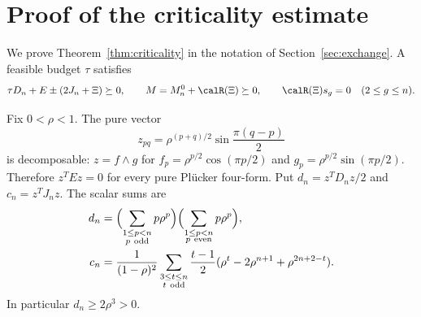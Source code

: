 \section{Proof of the criticality estimate}\label{app:criticality}
We prove Theorem~\ref{thm:criticality} in the notation of
Section~\ref{sec:exchange}. A feasible
budget $\tau$ satisfies
\begin{equation}\label{eq:critical-feasible}
 \tau D_n+E\pm(2J_n+\Xi)\succeq0,\qquad
 M=M_n^0+\calR(\Xi)\succeq0,
 \qquad \calR(\Xi)s_g=0\quad(2\le g\le n).
\end{equation}

Fix $0<\rho<1$. The pure vector
\[
 z_{pq}=\rho^{(p+q)/2}\sin\frac{\pi(q-p)}2
\]
is decomposable: $z=f\wedge g$ for
$f_p=\rho^{p/2}\cos(\pi p/2)$ and $g_p=\rho^{p/2}\sin(\pi p/2)$.
Therefore $z^TEz=0$ for every pure Pl\"ucker four-form.
Put $d_n=z^TD_nz/2$ and $c_n=z^TJ_n z$. The scalar sums are
\begin{equation}\label{eq:critical-scalars}
\begin{split}
 d_n&=\Bigl(\sum_{\substack{1\le p<n\\p\ \mathrm{odd}}}p\rho^p\Bigr)
       \Bigl(\sum_{\substack{1\le p<n\\p\ \mathrm{even}}}p\rho^p\Bigr),\\
 c_n&=\frac1{(1-\rho)^2}
 \sum_{\substack{3\le t\le n\\t\ \mathrm{odd}}}\frac{t-1}{2}
       (\rho^t-2\rho^{n+1}+\rho^{2n+2-t}).
\end{split}
\end{equation}
In particular $d_n\ge2\rho^3>0$.


